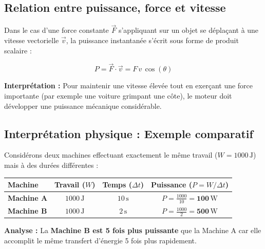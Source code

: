 \documentclass[11pt,openany]{book}
\begin{document}
\subsection*{Relation entre puissance, force et vitesse}

Dans le cas d'une force constante $\vec{F}$ s'appliquant sur un objet se déplaçant à une vitesse vectorielle $\vec{v}$, la puissance instantanée s'écrit sous forme de produit scalaire :

\[
\boxed{P = \vec{F} \cdot \vec{v} = F \, v \, \cos(\theta)}
\]

\noindent\textbf{Interprétation :} Pour maintenir une vitesse élevée tout en exerçant une force importante (par exemple une voiture grimpant une côte), le moteur doit développer une puissance mécanique considérable.

\subsection*{Interprétation physique : Exemple comparatif}

Considérons deux machines effectuant exactement le même travail ($W = \mathrm{1000\,J}$) mais à des durées différentes :

\vspace{0.3cm}

\begin{center}
\renewcommand{\arraystretch}{1.4}
\begin{tabular}{|l|c|c|c|}
\hline
\textbf{Machine} & \textbf{Travail ($W$)} & \textbf{Temps ($\Delta t$)} & \textbf{Puissance ($P = W/\Delta t$)} \\ \hline
\textbf{Machine A} & $\mathrm{1000\,J}$ & $\mathrm{10\,s}$ & $P = \frac{1000}{10} = \mathbf{100\,\mathrm{W}}$ \\ \hline
\textbf{Machine B} & $\mathrm{1000\,J}$ & $\mathrm{2\,s}$ & $P = \frac{1000}{2} = \mathbf{500\,\mathrm{W}}$ \\ \hline
\end{tabular}
\end{center}

\vspace{0.3cm}

\noindent\textbf{Analyse :} La \textbf{Machine B est 5 fois plus puissante} que la Machine A car elle accomplit le même transfert d'énergie 5 fois plus rapidement.

\end{document}
